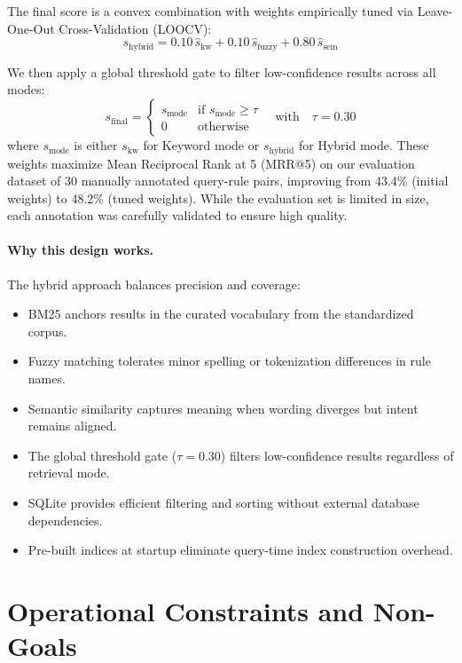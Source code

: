 The final score is a convex combination with weights empirically tuned via Leave-One-Out Cross-Validation (LOOCV):
\[
s_{\text{hybrid}} = 0.10\,\widehat{s}_{\text{kw}} + 0.10\,\widehat{s}_{\text{fuzzy}} + 0.80\,\widehat{s}_{\text{sem}}
\]

We then apply a global threshold gate to filter low-confidence results across all modes:
\[
\boxed{ \; s_{\text{final}} = \begin{cases}
s_{\text{mode}} & \text{if } s_{\text{mode}} \ge \tau \\
0 & \text{otherwise}
\end{cases}
\quad \text{with} \quad \tau = 0.30 \; }
\]
where $s_{\text{mode}}$ is either $s_{\text{kw}}$ for Keyword mode or $s_{\text{hybrid}}$ for Hybrid mode. These weights maximize Mean Reciprocal Rank at 5 (MRR@5) on our evaluation dataset of 30 manually annotated query-rule pairs, improving from 43.4\% (initial weights) to 48.2\% (tuned weights). While the evaluation set is limited in size, each annotation was carefully validated to ensure high quality.

\paragraph{Why this design works.} 
The hybrid approach balances precision and coverage:
\begin{itemize}[leftmargin=*,itemsep=2pt,topsep=2pt]
 \item BM25 anchors results in the curated vocabulary from the standardized corpus.
 \item Fuzzy matching tolerates minor spelling or tokenization differences in rule names.
 \item Semantic similarity captures meaning when wording diverges but intent remains aligned.
 \item The global threshold gate ($\tau=0.30$) filters low-confidence results regardless of retrieval mode.
 \item SQLite provides efficient filtering and sorting without external database dependencies.
 \item Pre-built indices at startup eliminate query-time index construction overhead.
\end{itemize}

\section{Operational Constraints and Non-Goals}
